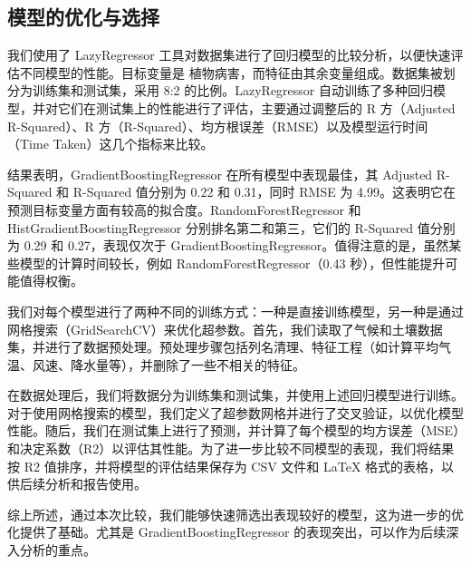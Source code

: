 \documentclass[AutoFakeBold]{LZUThesis-PgD&PhD}
\begin{document}
%		
	
	\subsection{模型的优化与选择}
	
	我们使用了 LazyRegressor 工具对数据集进行了回归模型的比较分析，以便快速评估不同模型的性能。目标变量是 植物病害，而特征由其余变量组成。数据集被划分为训练集和测试集，采用 8:2 的比例。LazyRegressor 自动训练了多种回归模型，并对它们在测试集上的性能进行了评估，主要通过调整后的 R 方（Adjusted R-Squared）、R 方（R-Squared）、均方根误差（RMSE）以及模型运行时间（Time Taken）这几个指标来比较。
	
	结果表明，GradientBoostingRegressor 在所有模型中表现最佳，其 Adjusted R-Squared 和 R-Squared 值分别为 0.22 和 0.31，同时 RMSE 为 4.99。这表明它在预测目标变量方面有较高的拟合度。RandomForestRegressor 和 HistGradientBoostingRegressor 分别排名第二和第三，它们的 R-Squared 值分别为 0.29 和 0.27，表现仅次于 GradientBoostingRegressor。值得注意的是，虽然某些模型的计算时间较长，例如 RandomForestRegressor（0.43 秒），但性能提升可能值得权衡。
	
	我们对每个模型进行了两种不同的训练方式：一种是直接训练模型，另一种是通过网格搜索（GridSearchCV）来优化超参数。首先，我们读取了气候和土壤数据集，并进行了数据预处理。预处理步骤包括列名清理、特征工程（如计算平均气温、风速、降水量等），并删除了一些不相关的特征。
	
	在数据处理后，我们将数据分为训练集和测试集，并使用上述回归模型进行训练。对于使用网格搜索的模型，我们定义了超参数网格并进行了交叉验证，以优化模型性能。随后，我们在测试集上进行了预测，并计算了每个模型的均方误差（MSE）和决定系数（R2）以评估其性能。为了进一步比较不同模型的表现，我们将结果按 R2 值排序，并将模型的评估结果保存为 CSV 文件和 LaTeX 格式的表格，以供后续分析和报告使用。
	
	综上所述，通过本次比较，我们能够快速筛选出表现较好的模型，这为进一步的优化提供了基础。尤其是 GradientBoostingRegressor 的表现突出，可以作为后续深入分析的重点。
	
	
	
\end{document}
